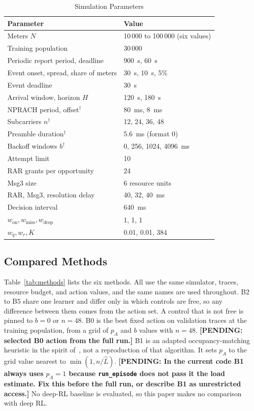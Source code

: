 \documentclass[conference]{IEEEtran}
\newcommand{\pending}[1]{\textbf{[PENDING: #1]}}
\begin{document}
\begin{table}[!t]
\caption{Simulation Parameters}
\label{tab:params}
\centering
\begin{tabular}{@{}l l@{}}
\hline
\textbf{Parameter} & \textbf{Value} \\
\hline
Meters $N$ & 10\,000 to 100\,000 (six values) \\
Training population & 30\,000 \\
Periodic report period, deadline & 900~s, 60~s \\
Event onset, spread, share of meters & 30~s, 10~s, 5\% \\
Event deadline & 30~s \\
Arrival window, horizon $H$ & 120~s, 180~s \\
NPRACH period, offset$^\dagger$ & 80~ms, 8~ms \\
Subcarriers $n^\dagger$ & 12, 24, 36, 48 \\
Preamble duration$^\dagger$ & 5.6~ms (format 0) \\
Backoff windows $b^\dagger$ & 0, 256, 1024, 4096~ms \\
Attempt limit & 10 \\
RAR grants per opportunity & 24 \\
Msg3 size & 6 resource units \\
RAR, Msg3, resolution delay & 40, 32, 40~ms \\
Decision interval & 640~ms \\
$w_{\mathrm{on}}, w_{\mathrm{miss}}, w_{\mathrm{drop}}$ & 1, 1, 1 \\
$w_q, w_r, K$ & 0.01, 0.01, 384 \\
\hline
\end{tabular}
\end{table}

\subsection{Compared Methods}
Table~\ref{tab:methods} lists the six methods. All use the same simulator, traces,
resource budget, and action values, and the same names are used throughout. B2 to B5
share one learner and differ only in which controls are free, so any difference
between them comes from the action set. A control that is not free is pinned to
$b = 0$ or $n = 48$. B0 is the best fixed action on validation traces at the training
population, from a grid of $p_A$ and $b$ values with $n = 48$. \pending{selected B0
action from the full run.} B1 is an adapted occupancy-matching heuristic in the
spirit of~\cite{duan}, not a reproduction of that algorithm. It sets $p_A$ to the grid
value nearest to $\min(1, n/\hat{L})$. \pending{In the current code B1 always uses $p_A = 1$
because \texttt{run\_episode} does not pass it the load estimate. Fix this before the
full run, or describe B1 as unrestricted access.} No deep-RL baseline is evaluated, so this paper makes no
comparison with deep RL.
\end{document}
